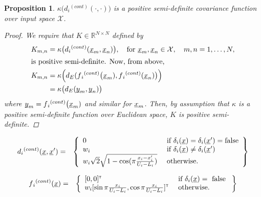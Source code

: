 \documentclass[letterpaper]{article}
\newcommand{\vect}[1]{\underline{\smash{#1}}}
\renewcommand{\v}[1]{\vect{#1}}
\newcommand{\reals}{\mathds{R}}
\newcommand{\sX}{\mathcal{X}}
\newcommand\transpose{{\textrm{\tiny{\sf{T}}}}}
\newtheorem{prop}[thm]{Proposition}
\begin{document}
\begin{prop}
  $\kappa\bigl(d{_i}^{(cont)}(\cdot,\cdot)\bigr)$ is a positive semi-definite covariance function over input space $\sX$. 
\label{prop:cont_psd_proof}
\begin{proof}
We require that $K \in \reals^{N\times N}$ defined by
\begin{align*}
 K_{m, n} & = \kappa\bigl(d{_i}^{(cont)}(\v{x}_m,\v{x}_n)\bigr)
,\quad \text{for }
\v{x}_m, \v{x}_n \in \sX,\quad m, n = 1, \ldots, N, 
\\
\intertext{is positive semi-definite. Now, from above,}
K_{m, n} & = \kappa\Bigl(d_E(f{_i}^{(cont)}\bigl(\v{x}_m), f{_i}^{(cont)}(\v{x}_n)\bigr)\Bigr) \\
& = \kappa\bigl(d_E(\v{y}_m, \v{y}_n)\bigr)
\end{align*}
where $\v{y}_m = f{_i}^{(cont)}\bigl(\v{x}_m)$ and similar for $\v{x}_m$. Then, by assumption that $\kappa$ is a positive semi-definite function over Euclidean space, $K$ is positive semi-definite. 
\end{proof}
\end{prop}


\begin{eqnarray}
\nonumber{}d{_i}^{(cont)}(\v{x}, \v{x}') & = & \left\{\begin{array}{ll}
\nonumber{} 0 & \textrm{ if } \delta_i(\v{x}) = \delta_i(\v{x}') = \textrm{false}\\
\nonumber{} w_i & \textrm{ if } \delta_i(\v{x}) \neq \delta_i(\v{x}')\\
\nonumber{} w_i \sqrt{2} \sqrt{1 - \cos(\pi \frac{x_i-x_i'}{U_i-L_i})} & \textrm{ otherwise. }\end{array}\right\}
\end{eqnarray}

\begin{eqnarray}
\nonumber{}f{_i}^{(cont)}(\v{x}) & = & \left\{\begin{array}{ll}
[0,0]^\transpose & \textrm{ if } \delta_i(\v{x}) = \textrm{ false }\\
\nonumber{} w_i [\sin{\pi\frac{x_i}{U_i-L_i}}, \cos{\pi\frac{x_i}{U_i-L_i}}]^\transpose & \textrm{ otherwise.}\end{array}\right\}
\end{eqnarray}
\end{document}
